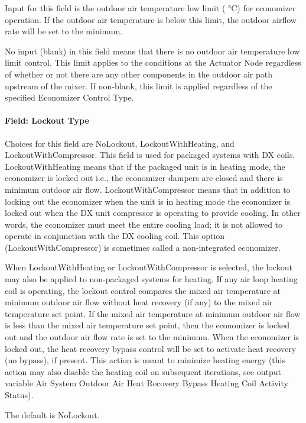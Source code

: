 Input for this field is the outdoor air temperature low limit ( °C) for economizer operation. If the outdoor air temperature is below this limit, the outdoor airflow rate will be set to the minimum.

No input (blank) in this field means that there is no outdoor air temperature low limit control. This limit applies to the conditions at the Actuator Node regardless of whether or not there are any other components in the outdoor air path upstream of the mixer. If non-blank, this limit is applied regardless of the specified Economizer Control Type.

\paragraph{Field: Lockout Type}\label{field-lockout-type}

Choices for this field are NoLockout, LockoutWithHeating, and LockoutWithCompressor. This field is used for packaged systems with DX coils. LockoutWithHeating means that if the packaged unit is in heating mode, the economizer is locked out i.e., the economizer dampers are closed and there is minimum outdoor air flow. LockoutWithCompressor means that in addition to locking out the economizer when the unit is in heating mode the economizer is locked out when the DX unit compressor is operating to provide cooling. In other words, the economizer must meet the entire cooling load; it is not allowed to operate in conjunction with the DX cooling coil. This option (LockoutWithCompressor) is sometimes called a non-integrated economizer.

When LockoutWithHeating or LockoutWithCompressor is selected, the lockout may also be applied to non-packaged systems for heating. If any air loop heating coil is operating, the lockout control compares the mixed air temperature at minimum outdoor air flow without heat recovery (if any) to the mixed air temperature set point. If the mixed air temperature at minimum outdoor air flow is less than the mixed air temperature set point, then the economizer is locked out and the outdoor air flow rate is set to the minimum. When the economizer is locked out, the heat recovery bypass control will be set to activate heat recovery (no bypass), if present. This action is meant to minimize heating energy (this action may also disable the heating coil on subsequent iterations, see output variable Air System Outdoor Air Heat Recovery Bypass Heating Coil Activity Status).

The default is NoLockout.

